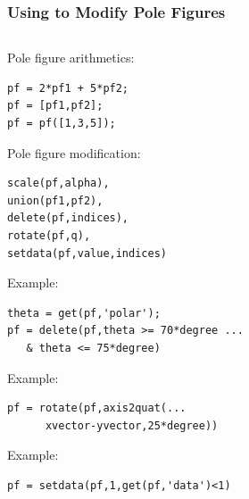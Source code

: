 \begin{frame}[fragile]

  \frametitle{Using \MTEX to Modify Pole Figures}

  \begin{columns}

    \begin{column}{8.5cm}

      Pole figure arithmetics:
\begin{lstlisting}
pf = 2*pf1 + 5*pf2;
pf = [pf1,pf2];
pf = pf([1,3,5]);
\end{lstlisting}

      Pole figure modification:

\begin{lstlisting}
scale(pf,alpha),
union(pf1,pf2),
delete(pf,indices),
rotate(pf,q),
setdata(pf,value,indices)
\end{lstlisting}

      \begin{overprint}

        Example:
\begin{lstlisting}
theta = get(pf,'polar');
pf = delete(pf,theta >= 70*degree ...
   & theta <= 75*degree)
\end{lstlisting}
        Example:
\begin{lstlisting}
pf = rotate(pf,axis2quat(...
      xvector-yvector,25*degree))

\end{lstlisting}
        Example:
\begin{lstlisting}
pf = setdata(pf,1,get(pf,'data')<1)
\end{lstlisting}

      \end{overprint}
    \end{column}


\end{columns}
\end{frame}
